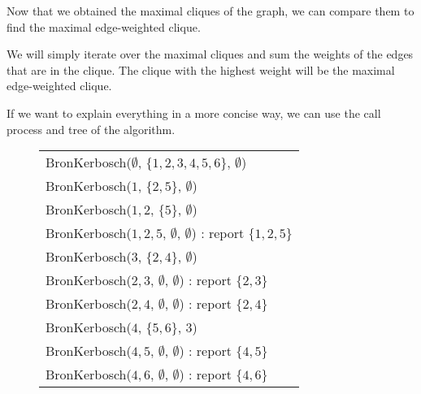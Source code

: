 Now that we obtained the maximal cliques of the graph, we can compare them to find
the maximal edge-weighted clique. \newline

We will simply iterate over the maximal cliques and sum the weights of the edges
that are in the clique. The clique with the highest weight will be the maximal
edge-weighted clique. \newline

\begin{minipage}{\linewidth}
    If we want to explain everything in a more concise way, we can use the call
    process and tree of the algorithm.
    \begin{figure}[H]
        \centering
        \begin{tabular}{|l|}
            \hline
            BronKerbosch($\emptyset$, $\{1,2,3,4,5,6\}$, $\emptyset$)                           \\
            \hspace{1em} BronKerbosch(${1}$, $\{2,5\}$, $\emptyset$)                            \\
            \hspace{2em} BronKerbosch(${1,2}$, $\{5\}$, $\emptyset$)                            \\
            \hspace{3em} BronKerbosch(${1,2,5}$, $\emptyset$, $\emptyset$) : report $\{1,2,5\}$ \\
            \hspace{1em} BronKerbosch(${3}$, $\{2,4\}$, $\emptyset$)                            \\
            \hspace{2em} BronKerbosch(${2,3}$, $\emptyset$, $\emptyset$) : report $\{2,3\}$     \\
            \hspace{2em} BronKerbosch(${2,4}$, $\emptyset$, $\emptyset$) : report $\{2,4\}$     \\
            \hspace{1em} BronKerbosch(${4}$, $\{5,6\}$, ${3}$)                                  \\
            \hspace{2em} BronKerbosch(${4,5}$, $\emptyset$, $\emptyset$) : report $\{4,5\}$     \\
            \hspace{2em} BronKerbosch(${4,6}$, $\emptyset$, $\emptyset$) : report $\{4,6\}$     \\

\end{tabular}
\end{figure}
\end{minipage}
